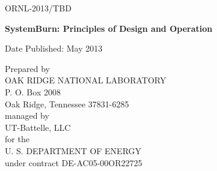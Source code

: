 \documentclass[11pt]{article}
\begin{document}
\newpage

\begin{titlepage}

\begin{flushright}ORNL-2013/TBD
\end{flushright}

\vspace{1.25in}

\begin{center}
{\bf{
SystemBurn: Principles of Design and Operation
}}
\vspace{0.5in}

\author{\\
Jeffery A. Kuehn, Stephen W. Poole, Stephen W. Hodson, \\
Joshua K. Lothian, Matthew B. Baker, Jonathan D. Dobson, \\
David B. Reister, Nicholas R. Lewkow, S. Ross Glandon, \\
Jacob T. Peek \\
\\
The Extreme Scale Systems Center \\
Computer Science and Mathematics Division \\
Oak Ridge National Laboratory \\
Oak Ridge, TN 37831 \\
http://www.csm.ornl.gov/essc\\
\\
\\
kuehn@ornl.gov, spoole@ornl.gov, hodsonsw@ornl.gov,\\
lothian@ornl.gov, bakermb@ornl.gov, dobsonjd@ornl.gov, \\
dbr@ornl.gov, lewkownr@ornl.gov, glandonsr@ornl.gov, \\
peekjt@ornl.gov\\
}


\vspace{1in}

Date Published: May 2013

\vspace{1in}

Prepared by \\
OAK RIDGE NATIONAL LABORATORY \\
P. O. Box 2008 \\
Oak Ridge, Tennessee 37831-6285 \\
managed by \\
UT-Battelle, LLC \\
for the \\
U. S. DEPARTMENT OF ENERGY \\
under contract DE-AC05-00OR22725

\end{center}

\end{titlepage}
\end{document}
